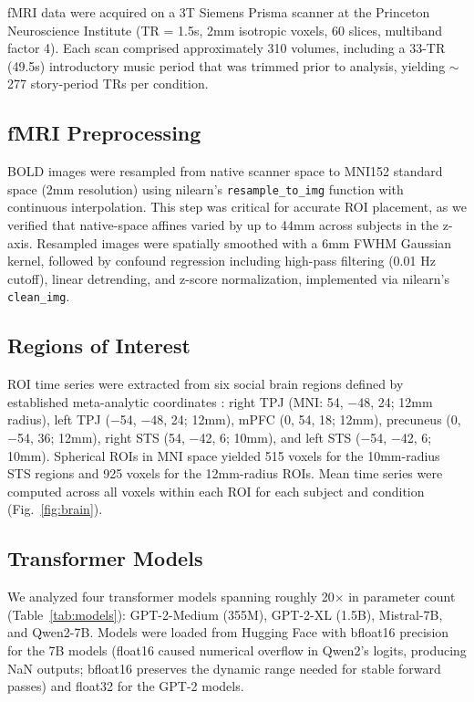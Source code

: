 \documentclass[conference]{IEEEtran}
\begin{document}
fMRI data were acquired on a 3T Siemens Prisma scanner at the Princeton Neuroscience Institute (TR = 1.5s, 2mm isotropic voxels, 60 slices, multiband factor 4). Each scan comprised approximately 310 volumes, including a 33-TR (49.5s) introductory music period that was trimmed prior to analysis, yielding $\sim$277 story-period TRs per condition.

\subsection{fMRI Preprocessing}

BOLD images were resampled from native scanner space to MNI152 standard space (2mm resolution) using nilearn's \texttt{resample\_to\_img} function with continuous interpolation. This step was critical for accurate ROI placement, as we verified that native-space affines varied by up to 44mm across subjects in the z-axis. Resampled images were spatially smoothed with a 6mm FWHM Gaussian kernel, followed by confound regression including high-pass filtering (0.01 Hz cutoff), linear detrending, and z-score normalization, implemented via nilearn's \texttt{clean\_img}.

\subsection{Regions of Interest}

ROI time series were extracted from six social brain regions defined by established meta-analytic coordinates \cite{schurz2014fractionating}: right TPJ (MNI: 54, $-$48, 24; 12mm radius), left TPJ ($-$54, $-$48, 24; 12mm), mPFC (0, 54, 18; 12mm), precuneus (0, $-$54, 36; 12mm), right STS (54, $-$42, 6; 10mm), and left STS ($-$54, $-$42, 6; 10mm). Spherical ROIs in MNI space yielded 515 voxels for the 10mm-radius STS regions and 925 voxels for the 12mm-radius ROIs. Mean time series were computed across all voxels within each ROI for each subject and condition (Fig.~\ref{fig:brain}).

\subsection{Transformer Models}

We analyzed four transformer models spanning roughly 20$\times$ in parameter count (Table~\ref{tab:models}): GPT-2-Medium (355M), GPT-2-XL (1.5B), Mistral-7B, and Qwen2-7B. Models were loaded from Hugging Face \cite{wolf2020transformers} with bfloat16 precision for the 7B models (float16 caused numerical overflow in Qwen2's logits, producing NaN outputs; bfloat16 preserves the dynamic range needed for stable forward passes) and float32 for the GPT-2 models.
\end{document}
